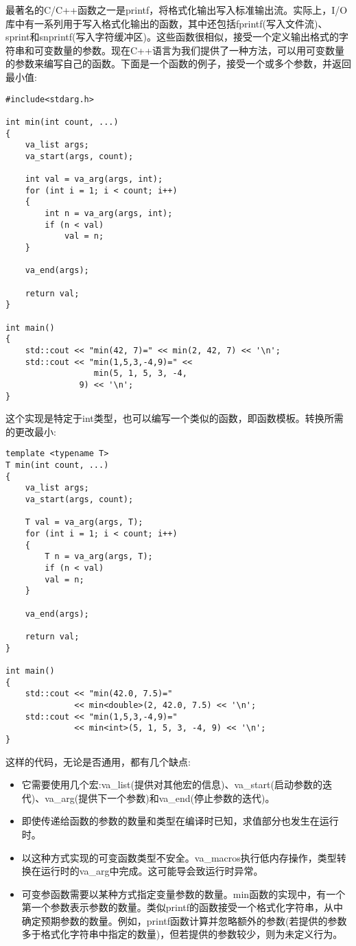 最著名的C/C++函数之一是printf，将格式化输出写入标准输出流。实际上，I/O库中有一系列用于写入格式化输出的函数，其中还包括fprintf(写入文件流)、sprint和snprintf(写入字符缓冲区)。这些函数很相似，接受一个定义输出格式的字符串和可变数量的参数。现在C++语言为我们提供了一种方法，可以用可变数量的参数来编写自己的函数。下面是一个函数的例子，接受一个或多个参数，并返回最小值:

\begin{lstlisting}[style=styleCXX]
#include<stdarg.h>

int min(int count, ...)
{
	va_list args;
	va_start(args, count);
	
	int val = va_arg(args, int);
	for (int i = 1; i < count; i++)
	{
		int n = va_arg(args, int);
		if (n < val)
			val = n;
	}

	va_end(args);
	
	return val;
}

int main()
{
	std::cout << "min(42, 7)=" << min(2, 42, 7) << '\n';
	std::cout << "min(1,5,3,-4,9)=" <<
				  min(5, 1, 5, 3, -4,
	           9) << '\n';
}
\end{lstlisting}

这个实现是特定于int类型，也可以编写一个类似的函数，即函数模板。转换所需的更改最小:

\begin{lstlisting}[style=styleCXX]
template <typename T>
T min(int count, ...)
{
	va_list args;
	va_start(args, count);
	
	T val = va_arg(args, T);
	for (int i = 1; i < count; i++)
	{
		T n = va_arg(args, T);
		if (n < val)
		val = n;
	}

	va_end(args);
	
	return val;
}

int main()
{
	std::cout << "min(42.0, 7.5)="
		      << min<double>(2, 42.0, 7.5) << '\n';
	std::cout << "min(1,5,3,-4,9)="
  	          << min<int>(5, 1, 5, 3, -4, 9) << '\n';
}
\end{lstlisting}

这样的代码，无论是否通用，都有几个缺点:

\begin{itemize}
\item
它需要使用几个宏:va\_list(提供对其他宏的信息)、va\_start(启动参数的迭代)、va\_arg(提供下一个参数)和va\_end(停止参数的迭代)。

\item
即使传递给函数的参数的数量和类型在编译时已知，求值部分也发生在运行时。

\item
以这种方式实现的可变函数类型不安全。va\_macros执行低内存操作，类型转换在运行时的va\_arg中完成。这可能导会致运行时异常。

\item
可变参函数需要以某种方式指定变量参数的数量。min函数的实现中，有一个第一个参数表示参数的数量。类似printf的函数接受一个格式化字符串，从中确定预期参数的数量。例如，printf函数计算并忽略额外的参数(若提供的参数多于格式化字符串中指定的数量)，但若提供的参数较少，则为未定义行为。
\end{itemize}


